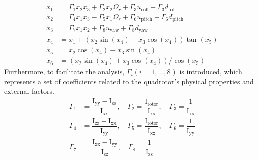\documentclass[3p,times]{elsarticle}
\begin{document}
\begin{align}\label{eq:diffeq}
	\dot x_1 &= \Gamma_1x_2 x_3 + \Gamma_2 x_2 \Omega_r + \Gamma_3u_{\text{roll}} + \Gamma_3d_{\text{roll}} \\[0.5em]
\dot x_2 &= \Gamma_4 x_1 x_3 - \Gamma_5 x_1 \Omega_r +  \Gamma_6u_{\text{pitch}} + \Gamma_6d_{\text{pitch}}\\[0.5em] \label{eq:diffeq-mid}
\dot x_3 &= \Gamma_7x_1 x_2 +  \Gamma_8u_{\text{yaw}} + \Gamma_8d_{\text{yaw}}\\[0.5em] 
\dot x_4 &= x_1 + (x_2\sin(x_4) + x_3\cos(x_4))\tan(x_5)
\\[0.5em]
\dot x_5 &= x_2\cos(x_4) - x_3\sin(x_4)\\[0.5em]
\dot x_6 &= (x_2\sin(x_4) + x_3\cos(x_4))/\cos(x_5) \label{eq:diffeq-end}
\end{align}
Furthermore, to facilitate the analysis, $\Gamma_i (i = 1, \ldots, 8)$ is introduced, which represents a set of coefficients related to the quadrotor's physical properties and external factors.
\begin{equation}
	\begin{split}
		\Gamma_1 &= \dfrac{\mathrm{I}_{\text{yy}} - \mathrm{I}_{\text{zz}}}{\mathrm{I}_{\text{xx}}}, \quad \Gamma_2 = \dfrac{\mathrm{I}_{\text{rotor}}}{\mathrm{I}_{\text{xx}}}, \quad \Gamma_3 = \dfrac{1}{\mathrm{I}_{\text{xx}}}\\ \Gamma_4 &= \dfrac{\mathrm{I}_{\text{zz}} - \mathrm{I}_{\text{xx}}}{\mathrm{I}_{\text{yy}}}, \quad \Gamma_5 = \dfrac{\mathrm{I}_{\text{rotor}}}{\mathrm{I}_{\text{xx}}}, \quad \Gamma_6 = \dfrac{1}{\mathrm{I}_{\text{yy}}} \\ \Gamma_7 &= \dfrac{\mathrm{I}_{\text{xx}} - \mathrm{I}_{\text{yy}}}{\mathrm{I}_{\text{zz}}}, \quad \Gamma_8 = \dfrac{1}{\mathrm{I}_{\text{zz}}}
	\end{split}
\end{equation}
\end{document}

